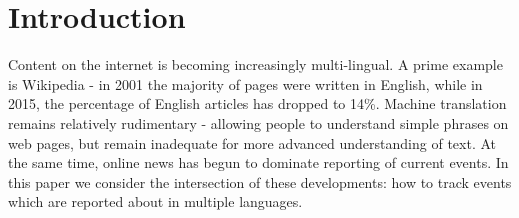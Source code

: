 \documentclass[twoside,11pt]{article}
\begin{document}
%
%

\section{Introduction}

Content on the internet is becoming increasingly multi-lingual. A prime example is Wikipedia - in 2001 the majority of pages were written in English, while in 2015, the percentage of English articles has dropped to 14\%. Machine translation remains relatively rudimentary - allowing people to understand simple phrases on web pages, but remain inadequate for more advanced understanding of text. At the same time, online news has begun to dominate reporting of current events. In this paper we consider the intersection of these developments: how to track events which are reported about in multiple languages.
\end{document}

